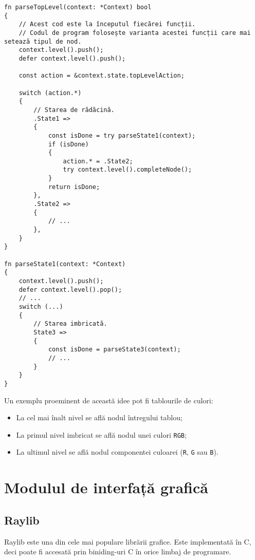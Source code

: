 \documentclass[a4paper,12pt]{report}
\begin{document}
\begin{verbatim}
fn parseTopLevel(context: *Context) bool
{
    // Acest cod este la începutul fiecărei funcții.
    // Codul de program folosește varianta acestei funcții care mai setează tipul de nod.
    context.level().push();
    defer context.level().push();

    const action = &context.state.topLevelAction;

    switch (action.*)
    {
        // Starea de rădăcină.
        .State1 =>
        {
            const isDone = try parseState1(context);
            if (isDone)
            {
                action.* = .State2;
                try context.level().completeNode();
            }
            return isDone;
        },
        .State2 =>
        {
            // ...
        },
    }
}

fn parseState1(context: *Context)
{
    context.level().push();
    defer context.level().pop();
    // ...
    switch (...)
    {
        // Starea imbricată.
        State3 =>
        {
            const isDone = parseState3(context);
            // ...
        }
    }
}
\end{verbatim}

Un exemplu proeminent de această idee pot fi tablourile de culori:
\begin{itemize}
    \item La cel mai înalt nivel se află nodul întregului tablou;
    \item La primul nivel imbricat se află nodul unei culori \texttt{\ac{RGB}};
    \item La ultimul nivel se află nodul componentei culoarei (\texttt{R}, \texttt{G} sau \texttt{B}).
\end{itemize}

\section{Modulul de interfață grafică}

\subsection{Raylib}

Raylib este una din cele mai populare librării grafice.
Este implementată în C, deci poate fi accesată prin biniding-uri C în orice limbaj de programare.
\end{document}
